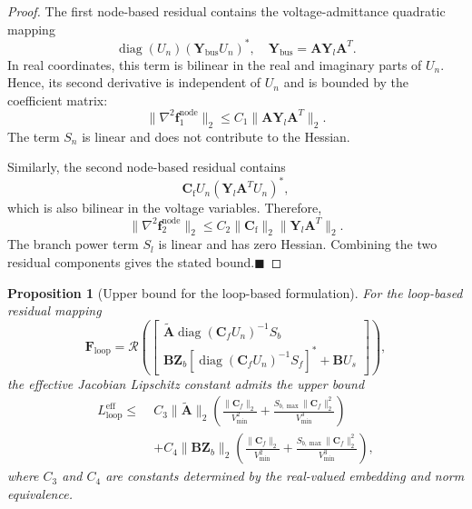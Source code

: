 \documentclass[journal]{IEEEtran}
\newtheorem{proposition}{Proposition}
\begin{document}
\begin{proof}
The first node-based residual contains the voltage-admittance quadratic mapping
\begin{equation}
\operatorname{diag}(U_n)(\mathbf{Y}_{\mathrm{bus}}U_n)^*,
\quad
\mathbf{Y}_{\mathrm{bus}}=\mathbf{A}\mathbf{Y}_l\mathbf{A}^T.
\end{equation}
In real coordinates, this term is bilinear in the real and imaginary parts of $U_n$. Hence, its second derivative is independent of $U_n$ and is bounded by the coefficient matrix:
\begin{equation}
\|\nabla^2 \mathbf{f}_{1}^{\mathrm{node}}\|_2
\leq
C_1\|\mathbf{A}\mathbf{Y}_l\mathbf{A}^T\|_2.
\end{equation}
The term $S_n$ is linear and does not contribute to the Hessian.

Similarly, the second node-based residual contains
\begin{equation}
\mathbf{C}_{\mathrm{f}}U_n(\mathbf{Y}_l\mathbf{A}^TU_n)^*,
\end{equation}
which is also bilinear in the voltage variables. Therefore,
\begin{equation}
\|\nabla^2 \mathbf{f}_{2}^{\mathrm{node}}\|_2
\leq
C_2\|\mathbf{C}_{\mathrm{f}}\|_2\|\mathbf{Y}_l\mathbf{A}^T\|_2.
\end{equation}
The branch power term $S_l$ is linear and has zero Hessian. Combining the two residual components gives the stated bound.\hfill $\blacksquare$
\end{proof}

\begin{proposition}[Upper bound for the loop-based formulation]
\label{prop:loop_bound}
For the loop-based residual mapping
\begin{equation}
\mathbf{F}_{\mathrm{loop}}
=
\mathcal{R}
\left(
\begin{bmatrix}
\tilde{\mathbf{A}}\operatorname{diag}(\mathbf{C}_fU_n)^{-1}S_b\\
\mathbf{B}\mathbf{Z}_b[\operatorname{diag}(\mathbf{C}_fU_n)^{-1}S_f]^*+\mathbf{B}U_s
\end{bmatrix}
\right),
\end{equation}
the effective Jacobian Lipschitz constant admits the upper bound
\begin{equation}
\begin{aligned}
L_{\mathrm{loop}}^{\mathrm{eff}}
\leq\;&
C_3\|\tilde{\mathbf{A}}\|_2
\left(
\frac{\|\mathbf{C}_f\|_2}{V_{\min}^{2}}
+
\frac{S_{b,\max}\|\mathbf{C}_f\|_2^{2}}{V_{\min}^{3}}
\right)  \\
&+
C_4\|\mathbf{B}\mathbf{Z}_b\|_2
\left(
\frac{\|\mathbf{C}_f\|_2}{V_{\min}^{2}}
+
\frac{S_{b,\max}\|\mathbf{C}_f\|_2^{2}}{V_{\min}^{3}}
\right),
\end{aligned}
\end{equation}
where $C_3$ and $C_4$ are constants determined by the real-valued embedding and norm equivalence.
\end{proposition}
\end{document}
